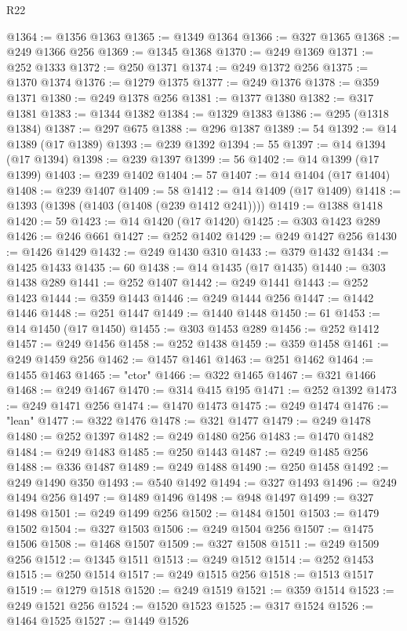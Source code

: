 \begin{lexlean}{R22}
\begin{coremodule}
@1364 := @1356 @1363
@1365 := @1349 @1364
@1366 := @327 @1365
@1368 := @249 @1366 @256
@1369 := @1345 @1368
@1370 := @249 @1369
@1371 := @252 @1333
@1372 := @250 @1371
@1374 := @249 @1372 @256
@1375 := @1370 @1374
@1376 := @1279 @1375
@1377 := @249 @1376
@1378 := @359 @1371
@1380 := @249 @1378 @256
@1381 := @1377 @1380
@1382 := @317 @1381
@1383 := @1344 @1382
@1384 := @1329 @1383
@1386 := @295 (@1318 @1384)
@1387 := @297 @675
@1388 := @296 @1387
@1389 := 54
@1392 := @14 @1389 (@17 @1389)
@1393 := @239 @1392
@1394 := 55
@1397 := @14 @1394 (@17 @1394)
@1398 := @239 @1397
@1399 := 56
@1402 := @14 @1399 (@17 @1399)
@1403 := @239 @1402
@1404 := 57
@1407 := @14 @1404 (@17 @1404)
@1408 := @239 @1407
@1409 := 58
@1412 := @14 @1409 (@17 @1409)
@1418 := @1393 (@1398 (@1403 (@1408 (@239 @1412 @241))))
@1419 := @1388 @1418
@1420 := 59
@1423 := @14 @1420 (@17 @1420)
@1425 := @303 @1423 @289
@1426 := @246 @661
@1427 := @252 @1402
@1429 := @249 @1427 @256
@1430 := @1426 @1429
@1432 := @249 @1430 @310
@1433 := @379 @1432
@1434 := @1425 @1433
@1435 := 60
@1438 := @14 @1435 (@17 @1435)
@1440 := @303 @1438 @289
@1441 := @252 @1407
@1442 := @249 @1441
@1443 := @252 @1423
@1444 := @359 @1443
@1446 := @249 @1444 @256
@1447 := @1442 @1446
@1448 := @251 @1447
@1449 := @1440 @1448
@1450 := 61
@1453 := @14 @1450 (@17 @1450)
@1455 := @303 @1453 @289
@1456 := @252 @1412
@1457 := @249 @1456
@1458 := @252 @1438
@1459 := @359 @1458
@1461 := @249 @1459 @256
@1462 := @1457 @1461
@1463 := @251 @1462
@1464 := @1455 @1463
@1465 := "ctor"
@1466 := @322 @1465
@1467 := @321 @1466
@1468 := @249 @1467
@1470 := @314 @415 @195
@1471 := @252 @1392
@1473 := @249 @1471 @256
@1474 := @1470 @1473
@1475 := @249 @1474
@1476 := "lean"
@1477 := @322 @1476
@1478 := @321 @1477
@1479 := @249 @1478
@1480 := @252 @1397
@1482 := @249 @1480 @256
@1483 := @1470 @1482
@1484 := @249 @1483
@1485 := @250 @1443
@1487 := @249 @1485 @256
@1488 := @336 @1487
@1489 := @249 @1488
@1490 := @250 @1458
@1492 := @249 @1490 @350
@1493 := @540 @1492
@1494 := @327 @1493
@1496 := @249 @1494 @256
@1497 := @1489 @1496
@1498 := @948 @1497
@1499 := @327 @1498
@1501 := @249 @1499 @256
@1502 := @1484 @1501
@1503 := @1479 @1502
@1504 := @327 @1503
@1506 := @249 @1504 @256
@1507 := @1475 @1506
@1508 := @1468 @1507
@1509 := @327 @1508
@1511 := @249 @1509 @256
@1512 := @1345 @1511
@1513 := @249 @1512
@1514 := @252 @1453
@1515 := @250 @1514
@1517 := @249 @1515 @256
@1518 := @1513 @1517
@1519 := @1279 @1518
@1520 := @249 @1519
@1521 := @359 @1514
@1523 := @249 @1521 @256
@1524 := @1520 @1523
@1525 := @317 @1524
@1526 := @1464 @1525
@1527 := @1449 @1526

\end{coremodule}
\end{lexlean}
